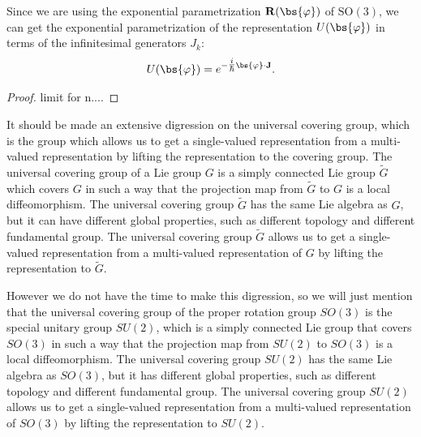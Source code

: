 \begin{example}
    Since we are using the exponential parametrization \(\mathbf{R}(\bs{\varphi})\) of \(\mathrm{SO}(3)\), we can get the exponential parametrization of the representation \(U(\bs{\varphi})\) in terms of the infinitesimal generators \(J_k\):
    \[
        U(\bs{\varphi}) = e^{-\tfrac{i}{\hbar} \bs{\varphi} \cdot \mathbf{J}}.
    \]
    \begin{proof}
        limit for n....
    \end{proof}

\end{example}


It should be made an extensive digression on the universal covering group, which is the group which allows us to get a single-valued representation from a multi-valued representation by lifting the representation to the covering group. The universal covering group of a Lie group \(G\) is a simply connected Lie group \(\tilde{G}\) which covers \(G\) in such a way that the projection map from \(\tilde{G}\) to \(G\) is a local diffeomorphism. The universal covering group \(\tilde{G}\) has the same Lie algebra as \(G\), but it can have different global properties, such as different topology and different fundamental group. The universal covering group \(\tilde{G}\) allows us to get a single-valued representation from a multi-valued representation of \(G\) by lifting the representation to \(\tilde{G}\).

However we do not have the time to make this digression, so we will just mention that the universal covering group of the proper rotation group \(SO(3)\) is the special unitary group \(SU(2)\), which is a simply connected Lie group that covers \(SO(3)\) in such a way that the projection map from \(SU(2)\) to \(SO(3)\) is a local diffeomorphism. The universal covering group \(SU(2)\) has the same Lie algebra as \(SO(3)\), but it has different global properties, such as different topology and different fundamental group. The universal covering group \(SU(2)\) allows us to get a single-valued representation from a multi-valued representation of \(SO(3)\) by lifting the representation to \(SU(2)\).